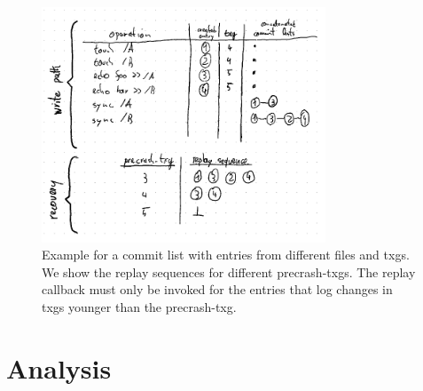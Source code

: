 \documentclass[12pt,a4paper,twoside]{book}
\begin{document}
\begin{figure}[H]
    \centering
    \includegraphics[height=7cm]{fig/zil_writepath_and_replay_sequence_logical_level}
    \caption{
        Example for a commit list with entries from different files and txgs.
        We show the replay sequences for different precrash-txgs.
        The replay callback must only be invoked for the entries that log changes in txgs younger than the precrash-txg.
    }
    \label{fig:zil_writepath_and_replay_sequence_logical_level}
\end{figure}

\section{Analysis}
\end{document}
